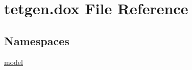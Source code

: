 \hypertarget{tetgen_8dox}{}\section{tetgen.\+dox File Reference}
\label{tetgen_8dox}
\subsection*{Namespaces}
\begin{DoxyCompactItemize}
\item 
 \hyperlink{namespacemodel}{model}
\end{DoxyCompactItemize}
